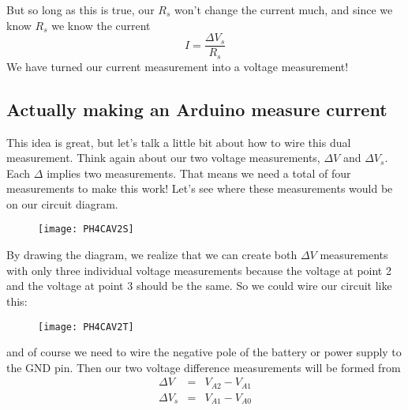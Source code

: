 But so long as this is true, our $R_{s}$ won't change the current much, and
since we know $R_{s}$ we know the current 
\begin{equation*}
I=\frac{\Delta V_{s}}{R_{s}}
\end{equation*}%
We have turned our current measurement into a voltage measurement!

\subsection{Actually making an Arduino measure current}

This idea is great, but let's talk a little bit about how to wire this dual
measurement. Think again about our two voltage measurements, $\Delta V$ and $%
\Delta V_{s}.$ Each $\Delta $ implies two measurements. That means we need a
total of four measurements to make this work! Let's see where these
measurements would be on our circuit diagram.

\begin{figure}[h!]
\texttt{[image: PH4CAV2S]}
\end{figure}By drawing the diagram, we
realize that we can create both $\Delta V$ measurements with only three
individual voltage measurements because the voltage at point 2 and the
voltage at point 3 should be the same. So we could wire our circuit like
this:\begin{figure}[h!]
\texttt{[image: PH4CAV2T]}
\end{figure}and of course we need to wire the
negative pole of the battery or power supply to the GND pin. Then our two
voltage difference measurements will be formed from 
\begin{eqnarray*}
\Delta V &=&V_{A2}-V_{A1} \\
\Delta V_{s} &=&V_{A1}-V_{A0}
\end{eqnarray*}

